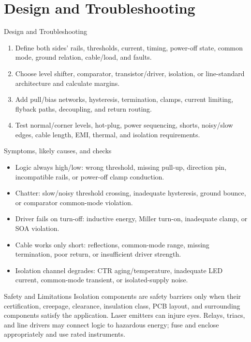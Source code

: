 \documentclass[10pt,letterpaper]{article}
\begin{document}
\section{Design and Troubleshooting}
\begin{CornellExamBox}{Design and Troubleshooting}
\begin{enumerate}
  \item Define both sides' rails, thresholds, current, timing, power-off state, common mode, ground relation, cable/load, and faults.
  \item Choose level shifter, comparator, transistor/driver, isolation, or line-standard architecture and calculate margins.
  \item Add pull/bias networks, hysteresis, termination, clamps, current limiting, flyback paths, decoupling, and return routing.
  \item Test normal/corner levels, hot-plug, power sequencing, shorts, noisy/slow edges, cable length, EMI, thermal, and isolation requirements.
\end{enumerate}\end{CornellExamBox}
\begin{CornellExamBox}{Symptoms, likely causes, and checks}
\begin{itemize}
  \item Logic always high/low: wrong threshold, missing pull-up, direction pin, incompatible rails, or power-off clamp conduction.
  \item Chatter: slow/noisy threshold crossing, inadequate hysteresis, ground bounce, or comparator common-mode violation.
  \item Driver fails on turn-off: inductive energy, Miller turn-on, inadequate clamp, or SOA violation.
  \item Cable works only short: reflections, common-mode range, missing termination, poor return, or insufficient driver strength.
  \item Isolation channel degrades: CTR aging/temperature, inadequate LED current, common-mode transient, or isolated-supply noise.
\end{itemize}\end{CornellExamBox}
\begin{CornellWarningBox}{Safety and Limitations}
Isolation components are safety barriers only when their certification, creepage, clearance, insulation class, PCB layout, and surrounding components satisfy the application. Laser emitters can injure eyes. Relays, triacs, and line drivers may connect logic to hazardous energy; fuse and enclose appropriately and use rated instruments.
\end{CornellWarningBox}
\end{document}
